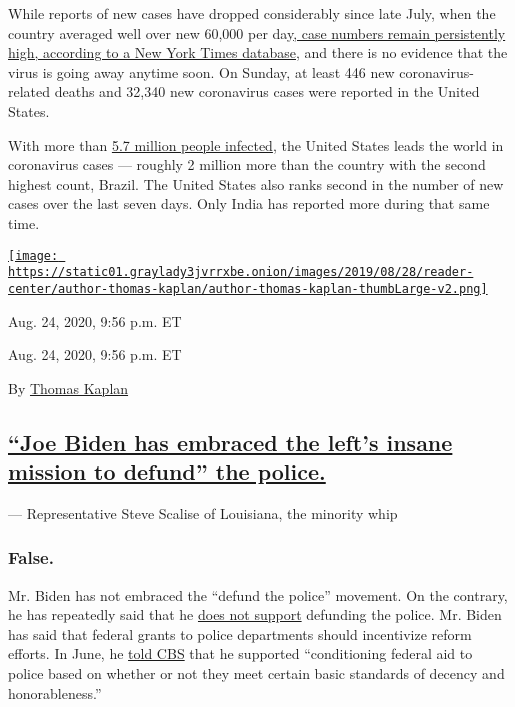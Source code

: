 While reports of new cases have dropped considerably since late July,
when the country averaged well over new 60,000 per
day\href{https://www.nytimes3xbfgragh.onion/interactive/2020/us/coronavirus-us-cases.html}{,
case numbers remain persistently high, according to a New York Times
database}, and there is no evidence that the virus is going away anytime
soon. On Sunday, at least 446 new coronavirus-related deaths and 32,340
new coronavirus cases were reported in the United States.

With more than
\href{https://www.nytimes3xbfgragh.onion/interactive/2020/world/coronavirus-maps.html}{5.7
million people infected}, the United States leads the world in
coronavirus cases --- roughly 2 million more than the country with the
second highest count, Brazil. The United States also ranks second in the
number of new cases over the last seven days. Only India has reported
more during that same time.

\href{https://www.nytimes3xbfgragh.onion/by/thomas-kaplan}{\texttt{[image: https://static01.graylady3jvrrxbe.onion/images/2019/08/28/reader-center/author-thomas-kaplan/author-thomas-kaplan-thumbLarge-v2.png]}}

Aug. 24, 2020, 9:56 p.m. ET

Aug. 24, 2020, 9:56 p.m. ET

By \href{https://www.nytimes3xbfgragh.onion/by/thomas-kaplan}{Thomas
Kaplan}

\hypertarget{joe-biden-has-embraced-the-lefts-insane-mission-to-defund-the-police}{%
\subsection{\texorpdfstring{\protect\hyperlink{joe-biden-has-embraced-the-lefts-insane-mission-to-defund-the-police}{``Joe
Biden has embraced the left's insane mission to defund'' the
police.}}{``Joe Biden has embraced the left's insane mission to defund'' the police.}}\label{joe-biden-has-embraced-the-lefts-insane-mission-to-defund-the-police}}

--- Representative Steve Scalise of Louisiana, the minority whip

\hypertarget{false--1}{%
\subsubsection{False. }\label{false--1}}

Mr. Biden has not embraced the ``defund the police'' movement. On the
contrary, he has repeatedly said that he
\href{https://www.nytimes3xbfgragh.onion/2020/08/15/us/politics/trump-campaign-ads-biden.html}{does
not support} defunding the police. Mr. Biden has said that federal
grants to police departments should incentivize reform efforts. In June,
he
\href{https://www.nytimes3xbfgragh.onion/2020/06/08/us/politics/biden-defund-the-police.html}{told
CBS} that he supported ``conditioning federal aid to police based on
whether or not they meet certain basic standards of decency and
honorableness.''

